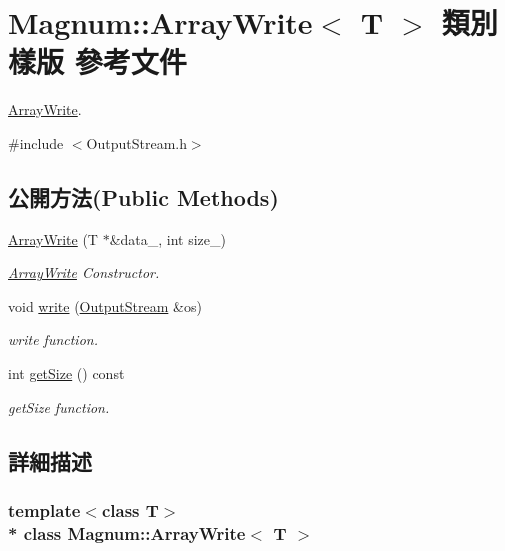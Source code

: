 \hypertarget{class_magnum_1_1_array_write}{}\section{Magnum\+:\+:Array\+Write$<$ T $>$ 類別 樣版 參考文件}
\label{class_magnum_1_1_array_write}


\hyperlink{class_magnum_1_1_array_write}{Array\+Write}.  




{\ttfamily \#include $<$Output\+Stream.\+h$>$}

\subsection*{公開方法(Public Methods)}
\begin{DoxyCompactItemize}
\item 
\hyperlink{class_magnum_1_1_array_write_a06a97b133998f0284c148a207bb8bb97}{Array\+Write} (T $\ast$\&data\+\_\+, int size\+\_\+)
\begin{DoxyCompactList}\small\item\em \hyperlink{class_magnum_1_1_array_write}{Array\+Write} Constructor. \end{DoxyCompactList}\item 
void \hyperlink{class_magnum_1_1_array_write_a2670b2bf9608c0eeee16ace945de2479}{write} (\hyperlink{class_magnum_1_1_output_stream}{Output\+Stream} \&os)
\begin{DoxyCompactList}\small\item\em write function. \end{DoxyCompactList}\item 
int \hyperlink{class_magnum_1_1_array_write_a998621bcdaf2b76d4247f14a74c80d43}{get\+Size} () const 
\begin{DoxyCompactList}\small\item\em get\+Size function. \end{DoxyCompactList}\end{DoxyCompactItemize}


\subsection{詳細描述}
\subsubsection*{template$<$class T$>$\\*
class Magnum\+::\+Array\+Write$<$ T $>$}

